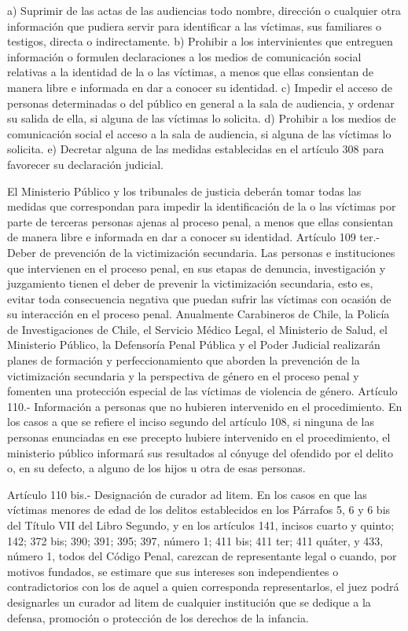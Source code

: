     a) Suprimir de las actas de las audiencias todo nombre, dirección o cualquier otra información que pudiera servir para identificar a las víctimas, sus familiares o testigos, directa o indirectamente.
    b) Prohibir a los intervinientes que entreguen información o formulen declaraciones a los medios de comunicación social relativas a la identidad de la o las víctimas, a menos que ellas consientan de manera libre e informada en dar a conocer su identidad.
    c) Impedir el acceso de personas determinadas o del público en general a la sala de audiencia, y ordenar su salida de ella, si alguna de las víctimas lo solicita.
    d) Prohibir a los medios de comunicación social el acceso a la sala de audiencia, si alguna de las víctimas lo solicita.
    e) Decretar alguna de las medidas establecidas en el artículo 308 para favorecer su declaración judicial.
     
    El Ministerio Público y los tribunales de justicia deberán tomar todas las medidas que correspondan para impedir la identificación de la o las víctimas por parte de terceras personas ajenas al proceso penal, a menos que ellas consientan de manera libre e informada en dar a conocer su identidad.
    Artículo 109 ter.- Deber de prevención de la victimización secundaria. Las personas e instituciones que intervienen en el proceso penal, en sus etapas de denuncia, investigación y juzgamiento tienen el deber de prevenir la victimización secundaria, esto es, evitar toda consecuencia negativa que puedan sufrir las víctimas con ocasión de su interacción en el proceso penal.
    Anualmente Carabineros de Chile, la Policía de Investigaciones de Chile, el Servicio Médico Legal, el Ministerio de Salud, el Ministerio Público, la Defensoría Penal Pública y el Poder Judicial realizarán planes de formación y perfeccionamiento que aborden la prevención de la victimización secundaria y la perspectiva de género en el proceso penal y fomenten una protección especial de las víctimas de violencia de género.
    Artículo 110.- Información a personas que no hubieren intervenido en el procedimiento. En los casos a que se refiere el inciso segundo del artículo 108, si ninguna de las personas enunciadas en ese precepto hubiere intervenido en el procedimiento, el ministerio público informará sus resultados al cónyuge del ofendido por el delito o, en su defecto, a alguno de los hijos u otra de esas personas.

    Artículo 110 bis.- Designación de curador ad litem. En los casos en que las víctimas menores de edad de los delitos establecidos en los Párrafos 5, 6 y 6 bis del Título VII del Libro Segundo, y en los artículos 141, incisos cuarto y quinto; 142; 372 bis; 390; 391; 395; 397, número 1; 411 bis; 411 ter; 411 quáter, y 433, número 1, todos del Código Penal, carezcan de representante legal o cuando, por motivos fundados, se estimare que sus intereses son independientes o contradictorios con los de aquel a quien corresponda representarlos, el juez podrá designarles un curador ad litem de cualquier institución que se dedique a la defensa, promoción o protección de los derechos de la infancia.



